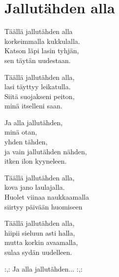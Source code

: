 \section{Jallutähden alla}

Täällä jallutähden alla \\
korkeimmalla kukkulalla. \\
Katson läpi lasin tyhjän, \\
sen täytän uudestaan. 

Täällä jallutähden alla, \\
lasi täyttyy leikatulla. \\
Siitä suojakseni peiton, \\
minä itselleni saan.

Ja alla jallutähden, \\
minä otan, \\
yhden tähden,\\ 
ja vain jallutähden nähden, \\
itken ilon kyyneleen.

Täällä jallutähden alla, \\
kova jano laulajalla. \\ 
Huolet viinaa naukkaamalla \\
siirtyy päivään huomiseen

Täällä jallutähden alla, \\
hiipii sieluun asti halla, \\
mutta korkin avaamalla, \\
sulaa sydän uudelleen. 

:,: Ja alla jallutähden... :,: